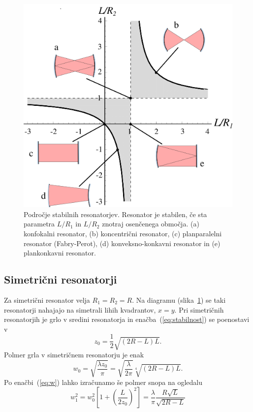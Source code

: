 \begin{figure}[h]
\centering
\includegraphics[width=8truecm]{slike/04_Stabilnost.png}
\caption{Področje stabilnih resonatorjev. Resonator je stabilen, 
če sta parametra $L/R_{1}$ in $L/R_{2}$ znotraj osenčenega območja. (a) konfokalni resonator,
(b) koncentrični resonator, (c) planparalelni resonator (Fabry-Perot), 
(d) konveksno-konkavni resonator in (e) plankonkavni resonator.}
\label{fig:Podrocje-stabilnih-resonatorjev}
\end{figure}

\subsection*{Simetrični resonatorji}
Za simetrični resonator velja $R_{1}=R_{2}=R$. Na diagramu 
(slika~\ref{fig:Podrocje-stabilnih-resonatorjev}) 
se taki resonatorji nahajajo na simetrali lihih kvadrantov, $x=y$. Pri simetričnih resonatorjih 
je grlo v sredini resonatorja in enačba~(\ref{eq:stabilnost}) se poenostavi v 
\begin{equation}
z_{0}=\frac{1}{2}\sqrt{(2R-L)L}.
\label{eq:zosim}
\end{equation}
Polmer grla v simetričnem resonatorju je enak
\begin{equation}
w_{0}=\sqrt{\frac{\lambda z_{0}}{\pi}}=\sqrt{\frac{\lambda}{2\pi}}\sqrt[4]{(2R-L)L}.
\label{eq:grlo_v_res}
\end{equation}
Po enačbi~(\ref{eq:w}) lahko izračunamo še polmer snopa na ogledalu
\begin{equation}
w_{1}^{2}=w_{0}^{2}\left[1+\left(\frac{L}{2z_{0}}\right)^{2}\right]=
\frac{\lambda}{\pi}\frac{R\sqrt{L}}{\sqrt{2R-L}}
\end{equation}

